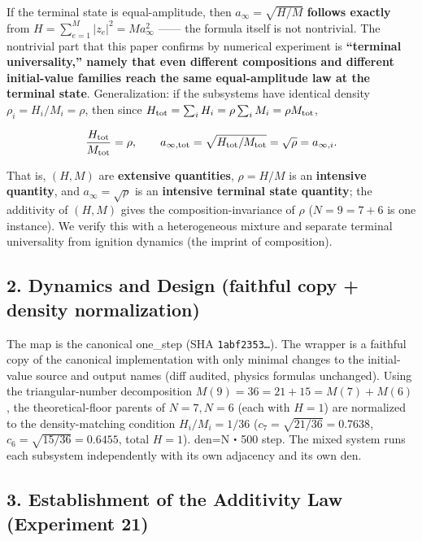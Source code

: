 \documentclass[
  a4paper,
]{ltjsarticle}
\begin{document}
If the terminal state is equal-amplitude, then \(a_\infty=\sqrt{H/M}\)
\textbf{follows exactly} from \(H=\sum_{e=1}^M|z_e|^2=Ma_\infty^2\)
------ the formula itself is not nontrivial. The nontrivial part that
this paper confirms by numerical experiment is \textbf{``terminal
universality,'' namely that even different compositions and different
initial-value families reach the same equal-amplitude law at the
terminal state}. Generalization: if the subsystems have identical
density \(\rho_i=H_i/M_i=\rho\), then since
\(H_{\rm tot}=\sum_iH_i=\rho\sum_iM_i=\rho M_{\rm tot}\),

\[\frac{H_{\rm tot}}{M_{\rm tot}}=\rho,\qquad a_{\infty,\rm tot}=\sqrt{H_{\rm tot}/M_{\rm tot}}=\sqrt\rho=a_{\infty,i}.\]

That is, \((H,M)\) are \textbf{extensive quantities}, \(\rho=H/M\) is an
\textbf{intensive quantity}, and \(a_\infty=\sqrt\rho\) is an
\textbf{intensive terminal state quantity}; the additivity of \((H,M)\)
gives the composition-invariance of \(\rho\) (\(N=9=7+6\) is one
instance). We verify this with a heterogeneous mixture and separate
terminal universality from ignition dynamics (the imprint of
composition).

\subsection{2. Dynamics and Design (faithful copy + density
normalization)}\label{dynamics-and-design-faithful-copy-density-normalization}

The map is the canonical one\_step (SHA \texttt{1abf2353…}). The wrapper
is a faithful copy of the canonical implementation with only minimal
changes to the initial-value source and output names (diff audited,
physics formulas unchanged). Using the triangular-number decomposition
\(M(9)=36=21+15=M(7)+M(6)\), the theoretical-floor parents of
\(N=7,N=6\) (each with \(H=1\)) are normalized to the density-matching
condition \(H_i/M_i=1/36\) (\(c_7=\sqrt{21/36}=0.7638\),
\(c_6=\sqrt{15/36}=0.6455\), total \(H=1\)). den=N・500 step. The mixed
system runs each subsystem independently with its own adjacency and its
own den.

\subsection{3. Establishment of the Additivity Law (Experiment
21)}\label{establishment-of-the-additivity-law-experiment-21}
\end{document}
